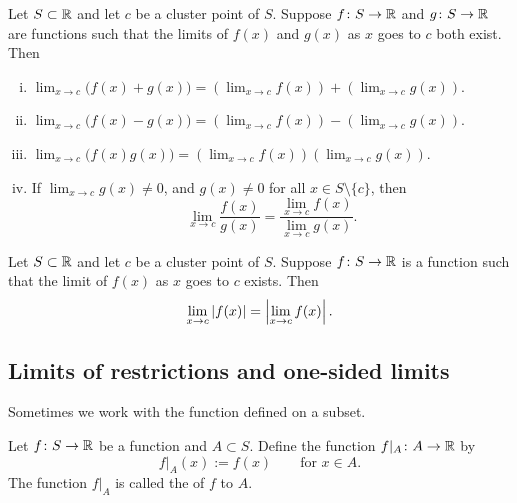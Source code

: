 \begin{cor} \label{falg:cor}
Let $S \subset {\mathbb{R}}$ and let $c$ be a cluster point of $S$.  
Suppose $f \colon S \to {\mathbb{R}}$ and
$g \colon S \to {\mathbb{R}}$ are functions
such that 
the limits of $f(x)$ and $g(x)$ as $x$ goes to $c$ both exist.
Then
\begin{enumerate}[(i)]
\item
$\displaystyle
\lim_{x\to c} \bigl(f(x)+g(x)\bigr) = \left(\lim_{x\to c} f(x)\right) + 
\left(\lim_{x\to c} g(x)\right) .
$
\item
$\displaystyle
\lim_{x\to c} \bigl(f(x)-g(x)\bigr) = \left(\lim_{x\to c} f(x)\right) -
\left(\lim_{x\to c} g(x)\right) .
$
\item
$\displaystyle
\lim_{x\to c} \bigl(f(x)g(x)\bigr) = \left(\lim_{x\to c} f(x)\right)
\left(\lim_{x\to c} g(x)\right) .
$
\item \label{falg:cor:iv} If
$\displaystyle \lim_{x\to c} g(x) \not= 0$,
and $g(x) \not= 0$ for all $x \in S \setminus \{ c \}$, then
\begin{equation*}
\lim_{x\to c} \frac{f(x)}{g(x)} =
\frac{\lim_{x\to c} f(x)}{\lim_{x\to c} g(x)} .
\end{equation*}
\end{enumerate}
\end{cor}

\begin{cor} \label{fabs:cor}
Let $S \subset {\mathbb{R}}$ and let $c$ be a cluster point of $S$.
Suppose $f \colon S \to {\mathbb{R}}$ is a function such that the limit of $f(x)$ as $x$ goes to $c$
exists.
Then
\begin{equation*}
\lim_{x\to c} \left\lvert {f(x)} \right\rvert =
\left\lvert {\lim_{x\to c} f(x)} \right\rvert.
\end{equation*}
\end{cor}

\subsection{Limits of restrictions and one-sided limits}

Sometimes we work with the function defined on a subset.

\begin{defn}
Let $f \colon S \to {\mathbb{R}}$ be a function and $A \subset S$.  Define the
function $f|_A \colon A \to {\mathbb{R}}$ by
\begin{equation*}
f|_A (x) := f(x)  \qquad \text{for } x \in A.
\end{equation*}
The function
$f|_A$ is called the \emph{} of $f$ to $A$.
\end{defn}

